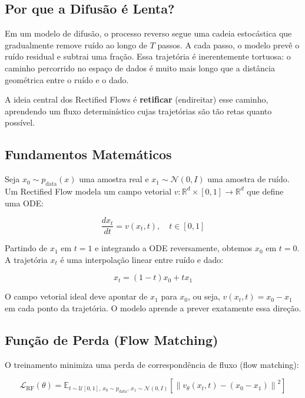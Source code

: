 \documentclass{tufte-handout}
\let\subsubsection\subsection
\begin{document}
\subsubsection{Por que a Difusão é Lenta?}

Em um modelo de difusão, o processo reverso segue uma cadeia estocástica que gradualmente remove ruído ao longo de $T$ passos. A cada passo, o modelo prevê o ruído residual e subtrai uma fração. Essa trajetória é inerentemente tortuosa: o caminho percorrido no espaço de dados é muito mais longo que a distância geométrica entre o ruído e o dado.

A ideia central dos Rectified Flows é \textbf{retificar} (endireitar) esse caminho, aprendendo um fluxo determinístico cujas trajetórias são tão retas quanto possível.

\subsubsection{Fundamentos Matemáticos}

Seja $x_0 \sim p_{\text{data}}(x)$ uma amostra real e $x_1 \sim \mathcal{N}(0, I)$ uma amostra de ruído. Um Rectified Flow modela um campo vetorial $v: \mathbb{R}^d \times [0, 1] \rightarrow \mathbb{R}^d$ que define uma ODE:

\begin{equation}
\frac{dx_t}{dt} = v(x_t, t), \quad t \in [0, 1]
\end{equation}

Partindo de $x_1$ em $t=1$ e integrando a ODE reversamente, obtemos $x_0$ em $t=0$. A trajetória $x_t$ é uma interpolação linear entre ruído e dado:

\begin{equation}
x_t = (1 - t) x_0 + t x_1
\end{equation}

O campo vetorial ideal deve apontar de $x_1$ para $x_0$, ou seja, $v(x_t, t) = x_0 - x_1$ em cada ponto da trajetória. O modelo aprende a prever exatamente essa direção.

\subsubsection{Função de Perda (Flow Matching)}

O treinamento minimiza uma perda de correspondência de fluxo (flow matching):

\begin{equation}
\mathcal{L}_{\text{RF}}(\theta) = \mathbb{E}_{t \sim \mathcal{U}[0,1], \, x_0 \sim p_{\text{data}}, \, x_1 \sim \mathcal{N}(0,I)} \left[ \left\| v_\theta(x_t, t) - (x_0 - x_1) \right\|^2 \right]
\end{equation}
\end{document}
